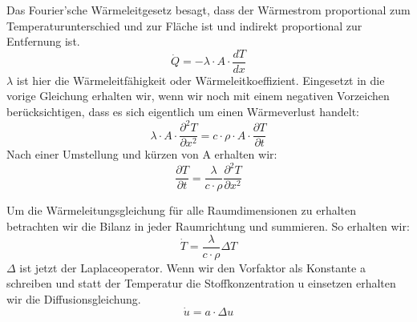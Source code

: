 \documentclass[
	11pt, %
]{beamer}
\begin{document}
\begin{frame}
	\begin{exampleblock}{}
		Das Fourier'sche W\"armeleitgesetz besagt, dass der W\"armestrom proportional zum Temperaturunterschied und zur Fl\"ache ist und indirekt proportional zur Entfernung ist.
		\begin{equation}
			\dot{Q} = -\lambda\cdot A\cdot\frac{dT}{dx}
		\end{equation}
		$\lambda$ ist hier die W\"armeleitf\"ahigkeit oder W\"armeleitkoeffizient.
	Eingesetzt in die vorige Gleichung erhalten wir, wenn wir noch mit einem negativen Vorzeichen ber\"ucksichtigen, dass es sich eigentlich um einen W\"armeverlust handelt:
	\begin{equation}
	\lambda\cdot A\cdot\frac{\partial^2T}{\partial x^2}=c\cdot\rho\cdot A  \cdot \frac{\partial T}{\partial t}
	\end{equation}
	Nach einer Umstellung und k\"urzen von A erhalten wir:	
		\begin{equation}
			\frac{\partial T}{\partial t}=\frac{\lambda}{c\cdot \rho}\frac{\partial ^2T}{\partial x^2}
		\end{equation}
	\end{exampleblock}
\end{frame}
\begin{frame}
	\begin{exampleblock}{}
		Um die W\"armeleitungsgleichung f\"ur alle Raumdimensionen zu erhalten betrachten wir die Bilanz in jeder Raumrichtung und summieren. So erhalten wir:
		\begin{equation}
			\dot{T}=\frac{\lambda}{c\cdot \rho}\Delta T
		\end{equation}
    $\Delta$ ist jetzt der Laplaceoperator.
		Wenn wir den Vorfaktor als Konstante a schreiben und statt der Temperatur die Stoffkonzentration u einsetzen erhalten wir die Diffusionsgleichung.
		\begin{equation}
			\dot{u}=a\cdot\Delta u
		\end{equation}
	\end{exampleblock}
\end{frame}
\end{document}
